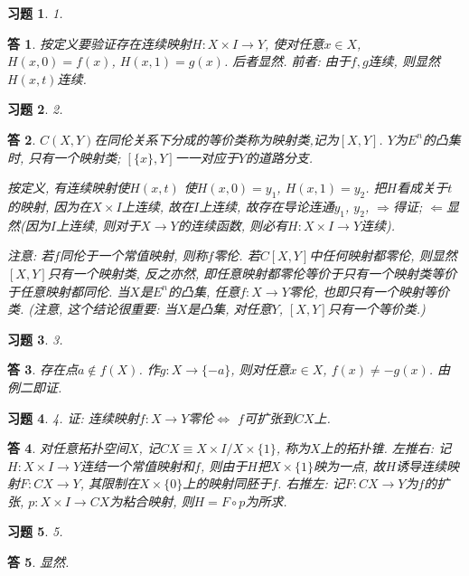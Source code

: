 \documentclass{ctexart}%
\newtheorem*{exercise}{习题}
\newtheorem*{solution}{答}
\theoremstyle{definition}
\theoremstyle{remark}
\begin{document}
\begin{exercise}1.
\end{exercise}
\begin{solution}
按定义要验证存在连续映射$H:X\times I\rightarrow Y$, 使对任意$x\in X$, $H(x,0)=f(x)$, $H(x,1)=g(x)$. 后者显然. 前者: 由于$f,g$连续, 则显然$H(x,t)$连续.
\end{solution}

\begin{exercise}2.
\end{exercise}
\begin{solution}
$C(X,Y)$在同伦关系下分成的等价类称为映射类,记为$[X,Y]$. $Y$为$E^n$的凸集时, 只有一个映射类; $[\{x\},Y]$一一对应于$Y$的道路分支. 

按定义, 有连续映射使$H(x,t)$ 使$H(x,0)=y_1$, $H(x,1)=y_2$. 把$H$看成关于$t$的映射, 因为在$X\times I$上连续, 故在$I$上连续, 故存在导论连通$y_1$, $y_2$, $\Rightarrow$得证; $\Leftarrow$显然(因为$I$上连续, 则对于$X\rightarrow Y$的连续函数, 则必有$H:X\times I\rightarrow Y$连续). 

注意: 若$f$同伦于一个常值映射, 则称$f$零伦. 若$C[X,Y]$中任何映射都零伦, 则显然$[X,Y]$只有一个映射类, 反之亦然, 即任意映射都零伦等价于只有一个映射类等价于任意映射都同伦. 当$X$是$E^n$的凸集, 任意$f:X\rightarrow Y$零伦, 也即只有一个映射等价类. (注意, 这个结论很重要: 当$X$是凸集, 对任意$Y$, $[X,Y]$只有一个等价类.)
\end{solution}

\begin{exercise}3.
\end{exercise}
\begin{solution}
存在点$a\notin f(X)$. 作$g: X\rightarrow \{-a\}$, 则对任意$x\in X$, $f(x)\neq -g(x)$. 由例二即证.
\end{solution}

\begin{exercise}4. 证: 连续映射$f:X\rightarrow Y$零伦$\Longleftrightarrow$ $f$可扩张到$CX$上.
\end{exercise}
\begin{solution}
对任意拓扑空间$X$, 记$CX\equiv X\times I/X\times \{1\}$, 称为$X$上的拓扑锥. 左推右: 记$H:X\times I\rightarrow Y$连结一个常值映射和$f$, 则由于$H$把$X\times\{1\}$映为一点, 故$H$诱导连续映射$F:CX\rightarrow Y$, 其限制在$X\times\{0\}$上的映射同胚于$f$. 右推左: 记$F:CX\rightarrow Y$为$f$的扩张, $p:X\times I\rightarrow CX$为粘合映射, 则$H=F\circ p$为所求.
\end{solution}

\begin{exercise}5.
\end{exercise}
\begin{solution}显然.
\end{solution}
\end{document}
